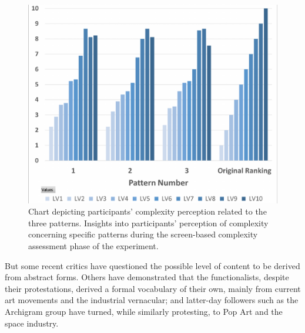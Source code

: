     \begin{figure}[htb]
        \centering
        \includegraphics[width=\linewidth]{Images/ComplexityPerceptionChart}
        \caption{Chart depicting participants' complexity perception related to the three patterns. Insights into participants' perception of complexity concerning specific patterns during the screen-based complexity assessment phase of the experiment.}
        \label{fig:ComplexityPerceptionChart}
    \end{figure}








    But some recent critics  have  questioned  the possible level of content to  be derived  from  abstract forms.
    Others have  demonstrated that the functionalists,  despite  their protestations, derived  a  formal vocabulary of their own, mainly from current art movements and the industrial vernacular;
    and  latter-day  followers  such  as  the  Archigram  group  have turned,  while  similarly  protesting,  to Pop  Art and  the space  industry.\cite{Venturi1972}


